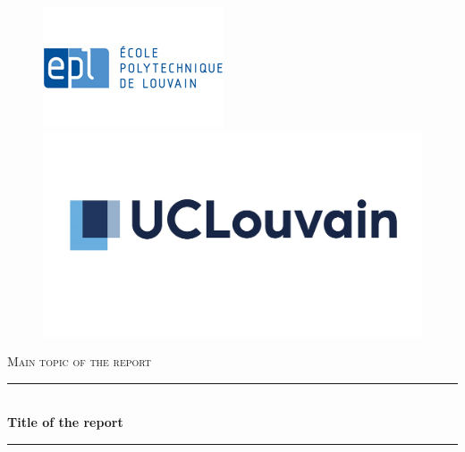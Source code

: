 \documentclass{article} %
\numberwithin{equation}{section} %
\begin{document}
\thispagestyle{fancy}

\begin{titlepage}

  \begin{sffamily}
  
  \begin{center}  
        
        \begin{figure}[h]
            \begin{minipage}[c]{0.5\textwidth}
            \flushleft
            \includegraphics[scale=0.8]{logo_epl.jpg}
            \end{minipage}%
            \begin{minipage}[c]{0.5\textwidth}
            \includegraphics[scale=0.37]{logo_ucl.jpg}
            \flushright 
            \end{minipage}
        \end{figure}
        
\vfill

        \textsc{\LARGE Main topic of the report}\\[0.3cm]
        \rule{16cm}{1pt}
        \medskip
        \\
        { \huge \rm \bf Title of the report \\[0.2cm] }
        \rule{16cm}{1pt}
        \\
    
        \vspace{1cm}
    

\end{center}
\end{sffamily}
\end{titlepage}
\end{document}
